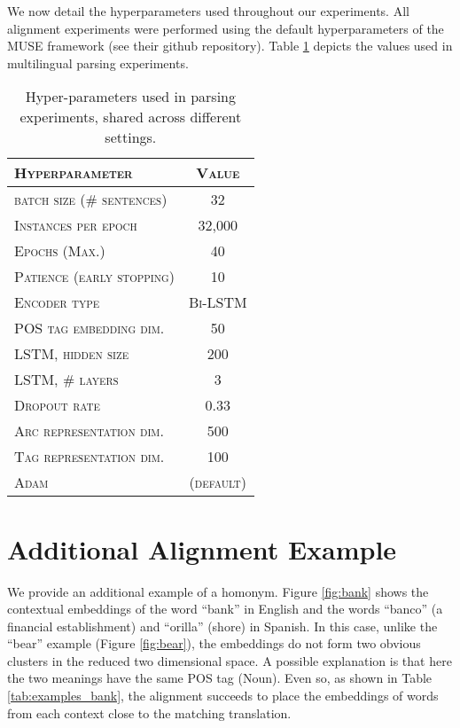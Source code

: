 \documentclass[11pt,a4paper]{article}
\newcommand{\tabref}[1]{Table \ref{#1}}
\newcommand{\figref}[1]{Figure \ref{#1}}
\begin{document}
We now detail the hyperparameters used throughout our experiments. All alignment experiments were performed using the default hyperparameters of the MUSE framework (see their github repository). Table \ref{table:hyper} depicts the values used in multilingual parsing experiments. 

\begin{table}[h!]
\centering
\begin{tabular}{lc}
\toprule
\textsc{Hyperparameter} & \textsc{Value} \\
\midrule
\textsc{batch size (\# sentences)} & 32 \\
\textsc{Instances per epoch} & 32,000 \\
\textsc{Epochs (Max.)} & 40 \\
\textsc{Patience (early stopping)} & 10 \\
\textsc{Encoder type} & \textsc{Bi-LSTM} \\
\textsc{POS tag embedding dim.} & 50 \\
\textsc{LSTM, hidden size} & 200 \\
\textsc{LSTM, \# layers}  & 3 \\
\textsc{Dropout rate} & 0.33 \\
\textsc{Arc representation dim.} & 500 \\
\textsc{Tag representation dim.} & 100 \\
\textsc{Adam} & \textsc{(default)} \\


\bottomrule
\end{tabular} 
\qquad
\caption{Hyper-parameters used in parsing experiments, shared across different settings.}
\label{table:hyper}
\end{table} \section{Additional Alignment Example}\label{appendix:space}

We provide an additional example of a homonym. \figref{fig:bank} shows the contextual embeddings of the word ``bank'' in English and the words ``banco'' (a financial establishment) and ``orilla'' (shore) in Spanish. In this case, unlike the ``bear'' example (\figref{fig:bear}), the embeddings do not form two obvious clusters in the reduced two dimensional space. A possible explanation is that here the two meanings have the same POS tag (Noun). Even so, as shown in \tabref{tab:examples_bank}, the alignment succeeds to place the embeddings of words from each context close to the matching translation. 
\end{document}
